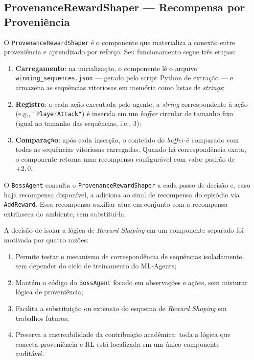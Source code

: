 \subsection{ProvenanceRewardShaper --- Recompensa por Proveniência}
\label{subsec:reward-shaper-impl}

O \texttt{ProvenanceRewardShaper} é o componente que materializa a conexão
entre proveniência e aprendizado por reforço. Seu funcionamento segue três
etapas:

\begin{enumerate}
    \item \textbf{Carregamento}: na inicialização, o componente lê o arquivo
          \texttt{winning\_sequences.json} --- gerado pelo script Python de
          extração --- e armazena as sequências vitoriosas em memória como
          listas de \textit{strings};
    \item \textbf{Registro}: a cada ação executada pelo agente, a
          \textit{string} correspondente à ação (e.g.,
          \texttt{"PlayerAttack"}) é inserida em um \textit{buffer} circular
          de tamanho fixo (igual ao tamanho das sequências, i.e., 3);
    \item \textbf{Comparação}: após cada inserção, o conteúdo do
          \textit{buffer} é comparado com todas as sequências vitoriosas
          carregadas. Quando há correspondência exata, o componente retorna
          uma recompensa configurável com valor padrão de $+2{,}0$.
\end{enumerate}

O \texttt{BossAgent} consulta o \texttt{ProvenanceRewardShaper} a cada passo
de decisão e, caso haja recompensa disponível, a adiciona ao sinal de
recompensa do episódio via \texttt{AddReward}. Essa recompensa auxiliar atua
em conjunto com a recompensa extrínseca do ambiente, sem substituí-la.

A decisão de isolar a lógica de \textit{Reward Shaping} em um componente
separado foi motivada por quatro razões:

\begin{enumerate}
    \item Permite testar o mecanismo de correspondência de sequências
          isoladamente, sem depender do ciclo de treinamento do ML-Agents;
    \item Mantém o código do \texttt{BossAgent} focado em observações e
          ações, sem misturar lógica de proveniência;
    \item Facilita a substituição ou extensão do esquema de \textit{Reward
          Shaping} em trabalhos futuros;
    \item Preserva a rastreabilidade da contribuição acadêmica: toda a lógica
          que conecta proveniência e RL está localizada em um único componente
          auditável.
\end{enumerate}

